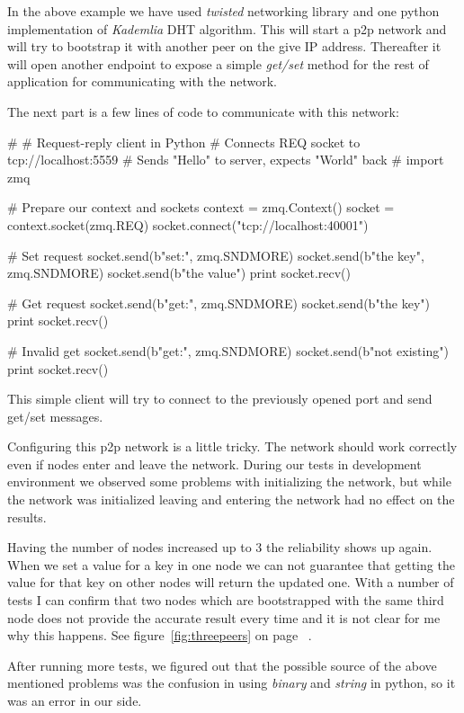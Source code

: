 In the above example we have used \textit{twisted} networking library\cite{TwistedMatrix} and one
python implementation\cite{KademliaImpl} of \textit{Kademlia} DHT algorithm\cite{KademliaPaper}. 
This will start a p2p network and will try to bootstrap it with another peer on the give IP address.
Thereafter it will open another endpoint to expose a simple \textit{get/set} method for the rest of
application for communicating with the network.

The next part is a few lines of code to communicate with this network:

\begin{python}
#
# Request-reply client in Python
# Connects REQ socket to tcp://localhost:5559
# Sends "Hello" to server, expects "World" back
#
import zmq

# Prepare our context and sockets
context = zmq.Context()
socket = context.socket(zmq.REQ)
socket.connect("tcp://localhost:40001")

# Set request
socket.send(b"set:", zmq.SNDMORE)
socket.send(b"the key", zmq.SNDMORE)
socket.send(b"the value")
print socket.recv()

# Get request
socket.send(b"get:", zmq.SNDMORE)
socket.send(b"the key")
print socket.recv()

# Invalid get
socket.send(b"get:", zmq.SNDMORE)
socket.send(b"not existing")
print socket.recv()
\end{python}

This simple client will try to connect to the previously opened port and send get/set messages.

Configuring this p2p network is a little tricky. The network should work correctly even if nodes enter
and leave the network. During our tests in development environment we observed some problems with initializing the network,
but while the network was initialized leaving and entering the network had no effect on the results.

Having the number of nodes increased up to 3 the reliability shows up again. When we set a value for a key 
in one node we can not guarantee that getting the value for that key on other nodes will return the updated one.
With a number of tests I can confirm that two nodes which are bootstrapped with the same third node does not
provide the accurate result every time and it is not clear for me why this happens. See figure~\ref{fig:threepeers} on page ~\pageref{fig:threepeers}.

After running more tests, we figured out that the possible source of the above mentioned problems 
was the confusion in using \textit{binary} and \textit{string} in python, so it was an error in our side.

